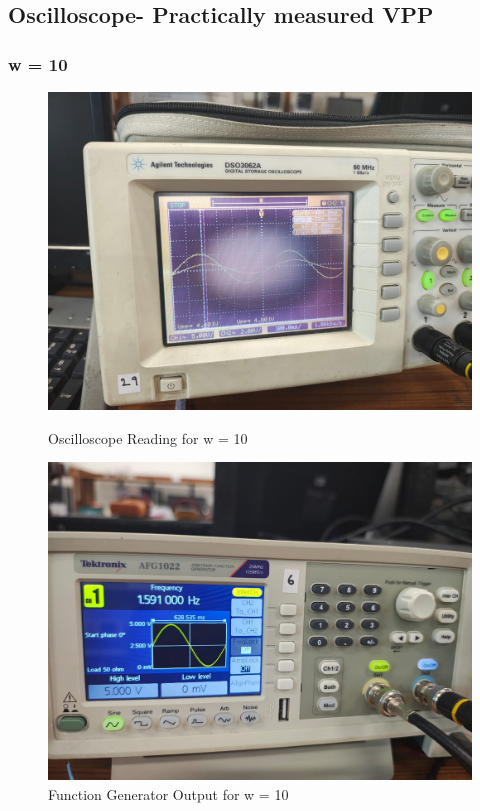 \documentclass[a4paper,12pt]{article}
\begin{document}
\subsection{Oscilloscope- Practically measured VPP}
\subsubsection{w = 10}
\begin{figure}[H]
    \centering
    \begin{minipage}{0.48\textwidth}
        \centering
        \includegraphics[width=\textwidth]{fig/2w10o.jpeg} %
        \caption{Oscilloscope Reading for w = 10}
    \end{minipage}
    \hfill
    \begin{minipage}{0.48\textwidth}
        \centering
        \includegraphics[width=\textwidth]{fig/2w10.jpeg} %
        \caption{Function Generator Output for w = 10}
    \end{minipage}
\end{figure}
\end{document}
